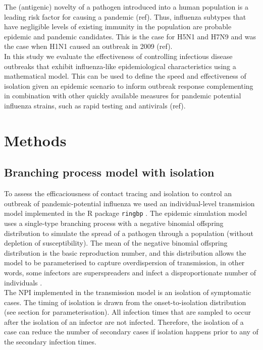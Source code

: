 \documentclass{article}
\begin{document}
The (antigenic) novelty of a pathogen introduced into a human population is a leading risk factor for causing a pandemic (ref). Thus, influenza subtypes that have negligible levels of existing immunity in the population are probable epidemic and pandemic candidates. This is the case for H5N1 and H7N9 \citep{tannerPandemicPotentialAvian2015} and was the case when H1N1 caused an outbreak in 2009 (ref). \\

In this study we evaluate the effectiveness of controlling infectious disease outbreaks that exhibit influenza-like epidemiological characteristics using a mathematical model. This can be used to define the speed and effectiveness of isolation given an epidemic scenario to inform outbreak response complementing in combination with other quickly available measures for pandemic potential influenza strains, such as rapid testing and antivirals (ref).

\section*{Methods}

\subsection*{Branching process model with isolation}

To assess the efficaciousness of contact tracing and isolation to control an outbreak of pandemic-potential influenza we used an individual-level transmision model implemented in the R package \texttt{{ringbp}} \citep{hellewellRingbpSimulateEvaluate2025}. The epidemic simulation model uses a single-type branching process with a negative binomial offspring distribution to simulate the spread of a pathogen through a population (without depletion of susceptibility). The mean of the negative binomial offspring distribution is the basic reproduction number, and this distribution allows the model to be parameterised to capture overdispersion of transmission, in other words, some infectors are superspreaders and infect a disproportionate number of individuals \citep{lloyd-smithSuperspreadingEffectIndividual2005, kucharskiEarlyDynamicsTransmission2020}. \\

The NPI implemented in the transmission model is an isolation of symptomatic cases. The timing of isolation is drawn from the onset-to-isolation distribution (see  section for parameterisation). All infection times that are sampled to occur after the isolation of an infector are not infected. Therefore, the isolation of a case can reduce the number of secondary cases if isolation happens prior to any of the secondary infection times. \\
\end{document}
